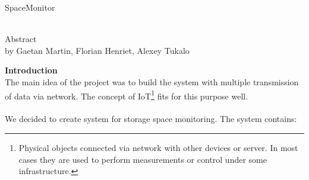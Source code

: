\documentclass[english]{article}
\date{}
\begin{document}
\begin{center}
\begin{large}
SpaceMonitor
\end{large}\\
Abstract\\
by 
Gaetan Martin,
Florian Henriet,
Alexey Tukalo
\end{center}

\textbf{Introduction }\\
The main idea of the project was to build the system with multiple transmission of data via network. The concept of IoT\footnote{Physical objects connected via network with other devices or server. In most cases they are used to perform measurements or control under some infrastructure.} fits for this purpose well.\\\\
We decided to create system for storage space monitoring. The system contains: 
\end{document}
